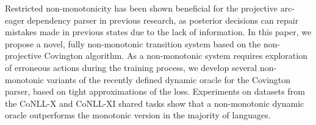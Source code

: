 Restricted non-monotonicity has been shown beneficial for the projective arc-eager dependency parser in previous research, as posterior decisions can repair mistakes made in previous states due to the lack of information. In this paper, we propose a novel, fully non-monotonic transition system based on the non-projective Covington algorithm. As a non-monotonic system requires exploration of erroneous actions during the training process, we develop several non-monotonic variants of the recently defined dynamic oracle for the Covington parser, based on tight approximations of the loss. Experiments on datasets from the CoNLL-X and CoNLL-XI shared tasks show that a non-monotonic dynamic oracle outperforms the monotonic version in the majority of languages.
